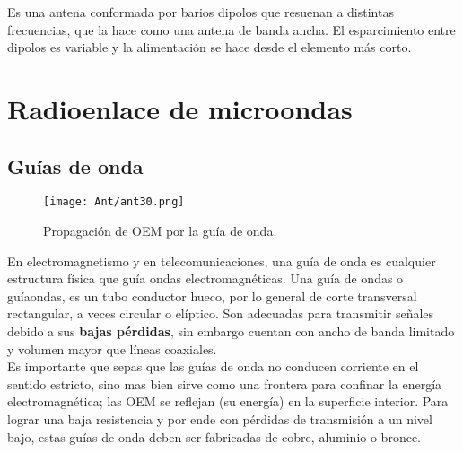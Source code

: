\documentclass[
	12pt, %
	fleqn, %
	a4paper, %
	oneside, %
]{LegrandOrangeBook}
\begin{document}
\begin{corollary}
Es una antena conformada por barios dipolos que resuenan a distintas frecuencias, que la hace como una antena de banda ancha. El esparcimiento entre dipolos es variable y la alimentación se hace desde el elemento más corto. 
\end{corollary}
\chapter{Radioenlace de microondas}
\section{Guías de onda}
\begin{wrapfigure}{r}{0.4\linewidth}
  \begin{center}
    \texttt{[image: Ant/ant30.png]}
  \end{center}
  \caption{Propagación de OEM por la guía de onda.}
\end{wrapfigure}
En electromagnetismo y en telecomunicaciones, una guía de onda es cualquier estructura física que guía ondas electromagnéticas. Una guía de ondas o guíaondas, es un tubo conductor hueco, por lo general de corte transversal rectangular, a veces circular o elíptico. Son adecuadas para transmitir señales debido a sus \textbf{bajas pérdidas}, sin embargo cuentan con ancho de banda limitado y volumen mayor que líneas coaxiales.\\
Es importante que sepas que las guías de onda no conducen corriente en el sentido estricto, sino mas bien sirve como una frontera para confinar la energía electromagnética; las OEM se reflejan (su energía) en la superficie interior.
Para lograr una baja resistencia y por ende con pérdidas de transmisión a un nivel bajo, estas guías de onda deben ser fabricadas de cobre, aluminio o bronce.\\
\end{document}
